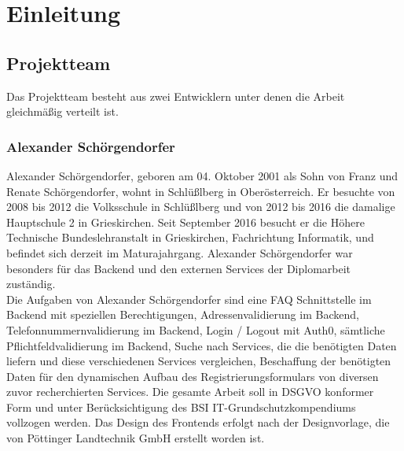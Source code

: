 \chapter{Einleitung} \label{sec:einleitung}
\section{Projektteam}
Das Projektteam besteht aus zwei Entwicklern unter denen die Arbeit gleichmäßig verteilt ist.
\subsection{Alexander Schörgendorfer}
Alexander Schörgendorfer, geboren am 04. Oktober 2001 als Sohn von Franz und Renate Schörgendorfer, wohnt in Schlüßlberg in Oberösterreich. Er besuchte von 2008 bis 2012 die Volksschule in Schlüßlberg und von 2012 bis 2016 die damalige Hauptschule 2 in Grieskirchen. Seit September 2016 besucht er die Höhere Technische Bundeslehranstalt in Grieskirchen, Fachrichtung Informatik, und befindet sich derzeit im Maturajahrgang. Alexander Schörgendorfer war besonders für das Backend und den externen Services der Diplomarbeit zuständig.\\
Die Aufgaben von Alexander Schörgendorfer sind eine FAQ Schnittstelle im Backend mit speziellen Berechtigungen, Adressenvalidierung im Backend, Telefonnummernvalidierung im Backend, Login / Logout mit Auth0, sämtliche Pflichtfeldvalidierung im Backend, Suche nach Services, die die benötigten Daten liefern und diese verschiedenen Services vergleichen, Beschaffung der benötigten Daten für den dynamischen Aufbau des Registrierungsformulars von diversen zuvor recherchierten Services. Die gesamte Arbeit soll in DSGVO konformer Form und unter Berücksichtigung des BSI IT-Grundschutzkompendiums vollzogen werden. Das Design des Frontends erfolgt nach der Designvorlage, die von Pöttinger Landtechnik GmbH erstellt worden ist.
